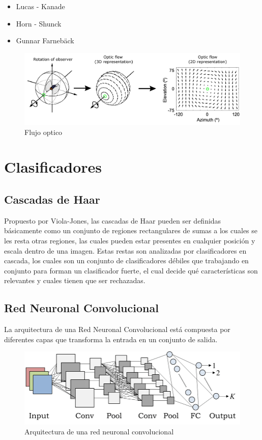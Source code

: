 \documentclass[a4paper,11pt]{report}
\begin{document}
\begin{itemize}
	\item Lucas - Kanade 
	\item Horn - Shunck
	\item Gunnar Farnebäck
\end{itemize}

\begin{figure}[h]
 \centering
  \includegraphics[scale=0.5]{opticFlow}
  \caption{Flujo optico }
  \label{fig:Flujo Optico}
\end{figure}



\section{Clasificadores}


\subsection{Cascadas de Haar}
Propuesto por Viola-Jones, las cascadas de Haar pueden ser  definidas básicamente como un conjunto de regiones rectangulares de sumas a los cuales se les resta otras regiones, las cuales pueden estar presentes en cualquier posición y escala dentro de una imagen. Estas restas son analizadas por clasificadores en cascada, los cuales son un conjunto de clasificadores débiles que trabajando en conjunto para forman un clasificador fuerte, el cual decide qué características son relevantes y cuales tienen que ser rechazadas.

\subsection{Red Neuronal Convolucional}
La arquitectura de una Red Neuronal Convolucional está compuesta por diferentes capas que transforma la entrada en un conjunto de salida.
\begin{figure}[h]
 \centering
  \includegraphics[scale=0.2]{cnn}
  \caption{Arquitectura de una red neuronal convolucional}
  \label{fig:Arquitectura Cnn}
\end{figure}
\end{document}
